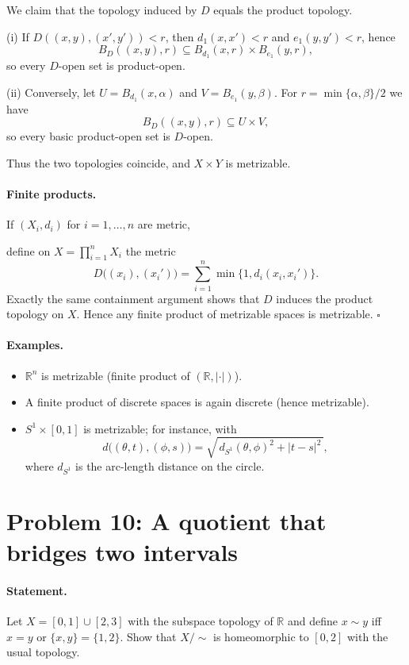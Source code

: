 \documentclass[12pt,a4paper]{article}
\newcommand{\qed}{\hfill$\square$}
\theoremstyle{plain}
\theoremstyle{definition}
\theoremstyle{remark}
\theoremstyle{remark}
\begin{document}
We claim that the topology induced by $D$ equals the product topology.

(i) If $D((x,y),(x',y'))<r$, then $d_1(x,x')<r$ and $e_1(y,y')<r$, hence
\[
B_D((x,y),r)\subseteq B_{d_1}(x,r)\times B_{e_1}(y,r),
\]
so every $D$-open set is product-open.

(ii) Conversely, let $U=B_{d_1}(x,\alpha)$ and $V=B_{e_1}(y,\beta)$. For $r=\min\{\alpha,\beta\}/2$ we have
\[
B_D((x,y),r)\subseteq U\times V,
\]
so every basic product-open set is $D$-open.

Thus the two topologies coincide, and $X\times Y$ is metrizable.

\paragraph{Finite products.}
If $(X_i,d_i)$ for $i=1,\dots,n$ are metric,

 define on $X=\prod_{i=1}^n X_i$ the metric
\[
D\big((x_i),(x_i')\big)=\sum_{i=1}^n \min\{1,d_i(x_i,x_i')\}.
\]
Exactly the same containment argument shows that $D$ induces the product topology on $X$. Hence any finite product of metrizable spaces is metrizable. \qed

\paragraph{Examples.}
\begin{itemize}
	\item $\mathbb{R}^n$ is metrizable (finite product of $(\mathbb{R},|\cdot|)$).
	\item A finite product of discrete spaces is again discrete (hence metrizable).
	\item $S^1\times[0,1]$ is metrizable; for instance, with
	\[
	d\big((\theta,t),(\phi,s)\big)
	=\sqrt{\,d_{S^1}(\theta,\phi)^2 + |t-s|^2\,},
	\]
	where $d_{S^1}$ is the arc-length distance on the circle.
\end{itemize}
	
	\section*{Problem 10: A quotient that bridges two intervals}
	
	\paragraph{Statement.}
	Let $X=[0,1]\cup[2,3]$ with the subspace topology of $\mathbb{R}$ and define $x\sim y$ iff $x=y$ or $\{x,y\}=\{1,2\}$. Show that $X/\!\sim$ is homeomorphic to $[0,2]$ with the usual topology.
	
\end{document}
